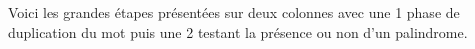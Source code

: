 Voici les grandes étapes présentées sur deux colonnes avec une 1\iere{} phase de duplication du mot puis une 2\ieme{} testant la présence ou non d'un palindrome.



